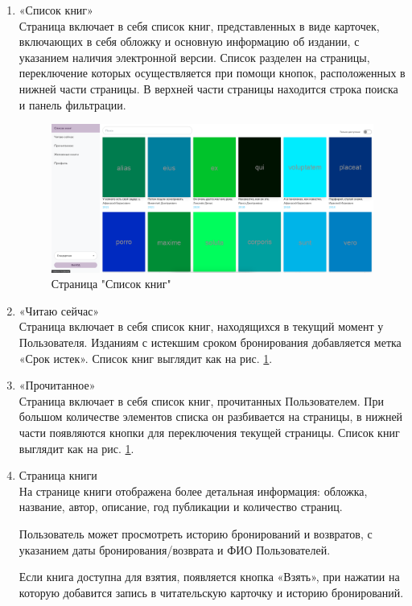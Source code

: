 \documentclass[project.tex]{subfiles}
\begin{document}
\begin{enumerate}
    \item «Список книг»\\
    Страница включает в себя список книг, представленных в виде карточек, включающих в себя обложку и основную информацию об издании, с указанием наличия электронной версии.
    Список разделен на страницы, переключение которых осуществляется при помощи кнопок, расположенных в нижней части страницы.
    В верхней части страницы находится строка поиска и панель фильтрации.
    \begin{figure}[H]
        \includegraphics[width=\textwidth, frame]{../../graphics/mainpage.png}
        \caption{Страница "Список книг"}
        \label{pic:main}
    \end{figure}
    \item «Читаю сейчас»\\
    Страница включает в себя список книг, находящихся в текущий момент у Пользователя. Изданиям с истекшим сроком бронирования добавляется метка «Срок истек». Список книг выглядит как на рис. \ref{pic:main}.
    \item «Прочитанное»\\
    Страница включает в себя список книг, прочитанных Пользователем. При большом количестве элементов списка он разбивается на страницы, в нижней части появляются кнопки для переключения текущей страницы. Список книг выглядит как на рис. \ref{pic:main}.
    \item Страница книги\\
    На странице книги отображена более детальная информация: обложка, название, автор, описание, год публикации и количество страниц.
    \par
    Пользователь может просмотреть историю бронирований и возвратов, с указанием даты бронирования/возврата и ФИО Пользователей.
    \par
    Если книга доступна для взятия, появляется кнопка «Взять», при нажатии на которую добавится запись в читательскую карточку и историю бронирований.

\end{enumerate}
\end{document}
